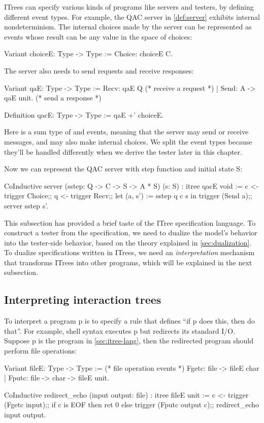 ITrees can specify various kinds of programs like servers and testers, by
defining different event types.  For example, the QAC server in
\autoref{def:server} exhibits internal nondeterminism.  The internal choices
made by the server can be represented as  events whose result can be
any value in the space of choices:
\begin{coq}
  Variant choiceE: Type -> Type :=
    Choice: choiceE C.
\end{coq}

The server also needs to send requests and receive responses:
\begin{coq}
  Variant qaE: Type -> Type :=
    Recv: qaE Q           (* receive a request *)
  | Send: A -> qaE unit.  (* send a response   *)

  Definition qacE: Type -> Type := qaE +' choiceE.
\end{coq}

Here  is a sum type of  and  events, meaning
that the server may send or receive messages, and may also make internal
choices.  We split the event types because they'll be handled differently when
we derive the tester later in this chapter.

Now we can represent the QAC server with step function  and initial
state \ilc S:
\begin{coq}
  CoInductive server (sstep: Q -> C -> S -> A * S) (s: S)
              : itree qacE void :=
    c <- trigger Choice;;
    q <- trigger Recv;;
    let (a, s') := sstep q c s in
    trigger (Send a);;
    server sstep s'.
\end{coq}

This subsection has provided a brief taste of the ITree specification language.
To construct a tester from the specification, we need to dualize the model's
behavior into the tester-side behavior, based on the theory explained in
\autoref{sec:dualization}.  To dualize specifications written in ITrees, we need
an {\em interpretation} mechanism that transforms ITrees into other programs,
which will be explained in the next subsection.

\subsection{Interpreting interaction trees}
To interpret a program \ilc p is to specify a rule that defines ``if \ilc p does
this, then do that''.  For example, shell syntax 
executes \inlinec p but redirects its standard I/O.  Suppose \inlinec p is the
 program in \autoref{sec:itree-lang}, then the redirected program
should perform file operations:
\begin{coq}
  Variant fileE: Type -> Type :=      (* file operation events *)
    Fgetc: file ->         fileE char
  | Fputc: file -> char -> fileE unit.

  CoInductive redirect_echo (input output: file) : itree fileE unit :=
    c <- trigger (Fgetc input);;
    if c is EOF then ret 0
    else trigger (Fputc output c);;
         redirect_echo input output.
\end{coq}

